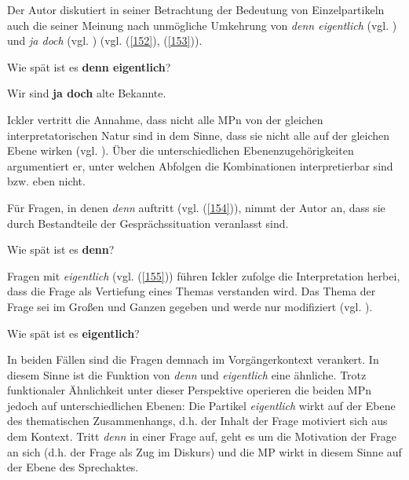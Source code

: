 Der Autor diskutiert in seiner Betrachtung der Bedeutung von Einzelpartikeln auch die seiner Meinung nach unmögliche Umkehrung von \textit{denn eigentlich} (vgl. \citealt[384]{Ickler1994}) und \textit{ja doch} (vgl. \citealt[404]{Ickler1994}) (vgl. (\ref{152}), (\ref{153})). 

\begin{exe}
	\ex\label{152} 
	Wie spät ist es \textbf{denn eigentlich}?
\end{exe}
\vspace{-0.65cm}	
\begin{exe}
	\ex\label{153} 
	Wir sind \textbf{ja doch} alte Bekannte.
\end{exe}		
Ickler vertritt die Annahme, dass nicht alle MPn von der gleichen interpretatorischen Natur sind in dem Sinne, dass sie nicht alle auf der gleichen Ebene wirken (vgl. \citealt[379]{Ickler1994}). Über die unterschiedlichen Ebenenzugehörigkeiten argumentiert er, unter welchen Abfolgen die Kombinationen interpretierbar sind bzw. eben nicht.

Für Fragen, in denen \textit{denn} auftritt (vgl. (\ref{154})), nimmt der Autor an, dass sie durch Bestandteile der Gesprächssituation veranlasst sind. 
	
\begin{exe}
	\ex\label{154} 
	Wie spät ist es \textbf{denn}?
\end{exe}	
Fragen mit \textit{eigentlich} (vgl. (\ref{155})) führen Ickler zufolge die Interpretation herbei, dass die Frage als Vertiefung eines Themas verstanden wird. Das Thema der Frage sei im Großen und Ganzen gegeben und werde nur modifiziert (vgl. \citealt[384]{Ickler1994}).

\begin{exe}
	\ex\label{155} 
	Wie spät ist es \textbf{eigentlich}?
\end{exe}
In beiden Fällen sind die Fragen demnach im Vorgängerkontext verankert. In diesem Sinne ist die Funktion von \textit{denn} und \textit{eigentlich} eine ähnliche. Trotz funktionaler Ähnlichkeit unter dieser Perspektive operieren die beiden MPn jedoch auf unterschiedlichen Ebenen: Die Partikel \textit{eigentlich} wirkt auf der Ebene des thematischen Zusammenhangs, d.h. der Inhalt der Frage motiviert sich aus dem Kontext. Tritt \textit{denn} in einer Frage auf, geht es um die Motivation der Frage an sich (d.h. der Frage als Zug im Diskurs) und die MP wirkt in diesem Sinne auf der Ebene des Sprechaktes. 

